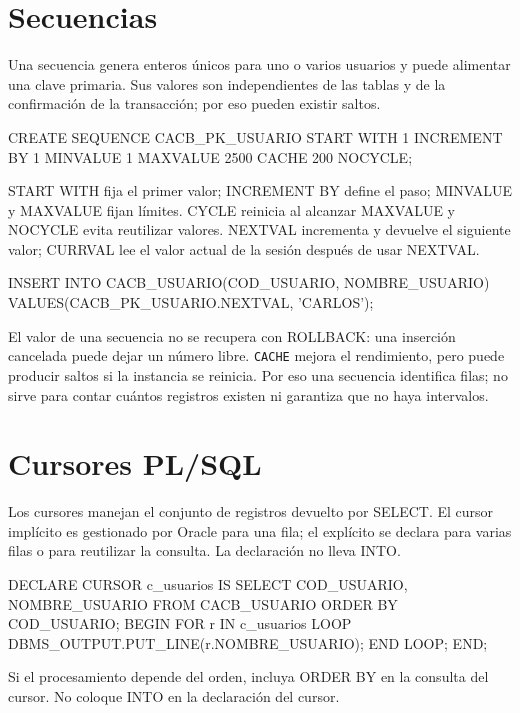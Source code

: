 \documentclass[10pt,letterpaper]{article}
\begin{document}
\section{Secuencias}
Una secuencia genera enteros únicos para uno o varios usuarios y puede alimentar
una clave primaria. Sus valores son independientes de las tablas y de la
confirmación de la transacción; por eso pueden existir saltos.
\begin{sqlexample}
CREATE SEQUENCE CACB_PK_USUARIO
  START WITH 1 INCREMENT BY 1
  MINVALUE 1 MAXVALUE 2500
  CACHE 200 NOCYCLE;
\end{sqlexample}
START WITH fija el primer valor; INCREMENT BY define el paso; MINVALUE y
MAXVALUE fijan límites. CYCLE reinicia al alcanzar MAXVALUE y NOCYCLE evita
reutilizar valores. NEXTVAL incrementa y devuelve el siguiente valor; CURRVAL
lee el valor actual de la sesión después de usar NEXTVAL.
\begin{sqlexample}
INSERT INTO CACB_USUARIO(COD_USUARIO, NOMBRE_USUARIO)
VALUES(CACB_PK_USUARIO.NEXTVAL, 'CARLOS');
\end{sqlexample}
El valor de una secuencia no se recupera con ROLLBACK: una inserción cancelada
puede dejar un número libre. \texttt{CACHE} mejora el rendimiento, pero puede
producir saltos si la instancia se reinicia. Por eso una secuencia identifica
filas; no sirve para contar cuántos registros existen ni garantiza que no haya
intervalos.

\section{Cursores PL/SQL}
Los cursores manejan el conjunto de registros devuelto por SELECT. El cursor
implícito es gestionado por Oracle para una fila; el explícito se declara para
varias filas o para reutilizar la consulta. La declaración no lleva INTO.
\begin{sqlexample}
DECLARE
  CURSOR c_usuarios IS
    SELECT COD_USUARIO, NOMBRE_USUARIO
    FROM CACB_USUARIO ORDER BY COD_USUARIO;
BEGIN
  FOR r IN c_usuarios LOOP
    DBMS_OUTPUT.PUT_LINE(r.NOMBRE_USUARIO);
  END LOOP;
END;
\end{sqlexample}
\begin{precaucion}
Si el procesamiento depende del orden, incluya ORDER BY en la consulta del
cursor. No coloque INTO en la declaración del cursor.
\end{precaucion}
\end{document}
